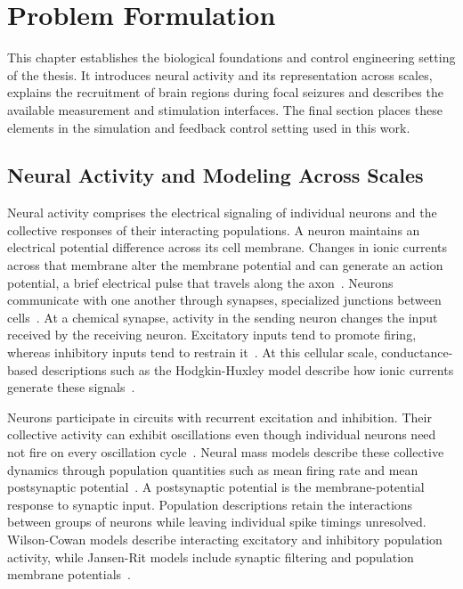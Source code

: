 \chapter{Problem Formulation}\label{ch:problem_formulation}

This chapter establishes the biological foundations and control engineering setting of the thesis.
It introduces neural activity and its representation across scales, explains the recruitment of brain regions during focal seizures and describes the available measurement and stimulation interfaces.
The final section places these elements in the simulation and feedback control setting used in this work.

\section{Neural Activity and Modeling Across Scales}\label{sec:neural_activity_background}

Neural activity comprises the electrical signaling of individual neurons and the collective responses of their interacting populations.
A neuron maintains an electrical potential difference across its cell membrane.
Changes in ionic currents across that membrane alter the membrane potential and can generate an action potential, a brief electrical pulse that travels along the axon~\cite{Hodgkin1952}.
Neurons communicate with one another through synapses, specialized junctions between cells~\cite{Sudhof2021}.
At a chemical synapse, activity in the sending neuron changes the input received by the receiving neuron.
Excitatory inputs tend to promote firing, whereas inhibitory inputs tend to restrain it~\cite{Wilson1972}.
At this cellular scale, conductance-based descriptions such as the Hodgkin-Huxley model describe how ionic currents generate these signals~\cite{Hodgkin1952}.

Neurons participate in circuits with recurrent excitation and inhibition.
Their collective activity can exhibit oscillations even though individual neurons need not fire on every oscillation cycle~\cite{Buzsaki2012}.
Neural mass models describe these collective dynamics through population quantities such as mean firing rate and mean postsynaptic potential~\cite{SanzLeon2013}.
A postsynaptic potential is the membrane-potential response to synaptic input.
Population descriptions retain the interactions between groups of neurons while leaving individual spike timings unresolved.
Wilson-Cowan models describe interacting excitatory and inhibitory population activity, while Jansen-Rit models include synaptic filtering and population membrane potentials~\cite{Wilson1972,Jansen1995}.

